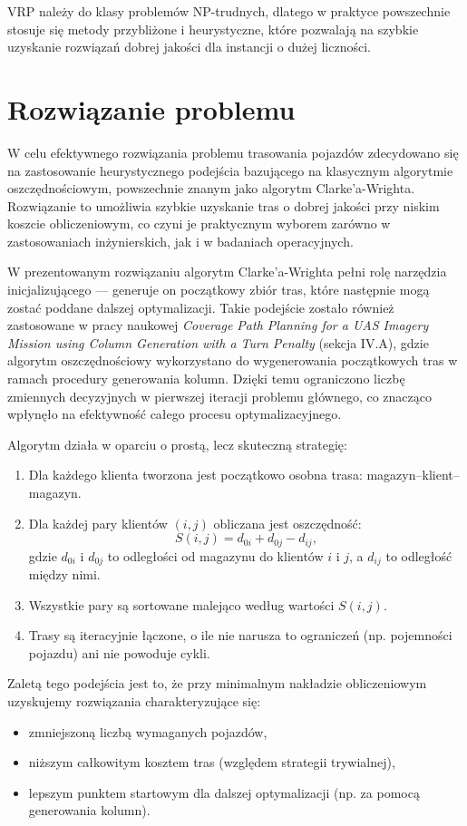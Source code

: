 \documentclass{article}
\begin{document}
VRP należy do klasy problemów NP-trudnych, dlatego w praktyce powszechnie stosuje się metody przybliżone i heurystyczne, które pozwalają na szybkie uzyskanie rozwiązań dobrej jakości dla instancji o dużej liczności.
\section{Rozwiązanie problemu}

W celu efektywnego rozwiązania problemu trasowania pojazdów zdecydowano się na zastosowanie heurystycznego podejścia bazującego na klasycznym algorytmie oszczędnościowym, powszechnie znanym jako algorytm Clarke’a-Wrighta. Rozwiązanie to umożliwia szybkie uzyskanie tras o dobrej jakości przy niskim koszcie obliczeniowym, co czyni je praktycznym wyborem zarówno w zastosowaniach inżynierskich, jak i w badaniach operacyjnych.

W prezentowanym rozwiązaniu algorytm Clarke’a-Wrighta pełni rolę narzędzia inicjalizującego — generuje on początkowy zbiór tras, które następnie mogą zostać poddane dalszej optymalizacji. Takie podejście zostało również zastosowane w pracy naukowej \textit{Coverage Path Planning for a UAS Imagery Mission using Column Generation with a Turn Penalty} (sekcja IV.A), gdzie algorytm oszczędnościowy wykorzystano do wygenerowania początkowych tras w ramach procedury generowania kolumn. Dzięki temu ograniczono liczbę zmiennych decyzyjnych w pierwszej iteracji problemu głównego, co znacząco wpłynęło na efektywność całego procesu optymalizacyjnego.

Algorytm działa w oparciu o prostą, lecz skuteczną strategię:
\begin{enumerate}
  \item Dla każdego klienta tworzona jest początkowo osobna trasa: magazyn–klient–magazyn.
  \item Dla każdej pary klientów $(i, j)$ obliczana jest oszczędność:
  \[
    S(i,j) = d_{0i} + d_{0j} - d_{ij},
  \]
  gdzie $d_{0i}$ i $d_{0j}$ to odległości od magazynu do klientów $i$ i $j$, a $d_{ij}$ to odległość między nimi.
  \item Wszystkie pary są sortowane malejąco według wartości $S(i,j)$.
  \item Trasy są iteracyjnie łączone, o ile nie narusza to ograniczeń (np. pojemności pojazdu) ani nie powoduje cykli.
\end{enumerate}

Zaletą tego podejścia jest to, że przy minimalnym nakładzie obliczeniowym uzyskujemy rozwiązania charakteryzujące się:
\begin{itemize}
  \item zmniejszoną liczbą wymaganych pojazdów,
  \item niższym całkowitym kosztem tras (względem strategii trywialnej),
  \item lepszym punktem startowym dla dalszej optymalizacji (np. za pomocą generowania kolumn).
\end{itemize}
\end{document}
